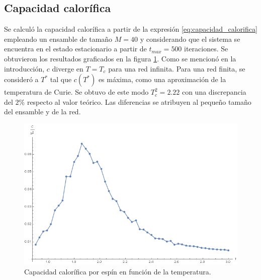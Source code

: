 \documentclass[aps,prb,twocolumn,superscriptaddress,floatfix,longbibliography]{revtex4-2}
\newcounter{para}
\begin{document}
\subsection{Capacidad calorífica}


Se calculó la capacidad calorífica a partir de la expresión \ref{eq:capacidad_calorifica} empleando un ensamble de tamaño $M = 40$ y considerando que el sistema se encuentra en el estado estacionario a partir de $t_{max} = 500$ iteraciones. Se obtuvieron los resultados graficados en la figura \ref{fig:capacidad_calorifica}. Como se mencionó en la introducción, $c$ diverge en $T=T_c$ para una red infinita. Para una red finita, se consideró a $T^*$ tal que $c(T^*)$ es máxima, como una aproximación de la temperatura de Curie. Se obtuvo de este modo $T_c^2 = 2.22$ con una discrepancia del $ 2\%$ respecto al valor teórico. Las diferencias se atribuyen al pequeño tamaño del ensamble y de la red.

\begin{figure}[h]
    \includegraphics[clip=true,width=\columnwidth]{capacidad_calorifica.png}
    \caption{Capacidad calorífica por espín en función de la temperatura.}
     \label{fig:capacidad_calorifica}
\end{figure}



\end{document}
